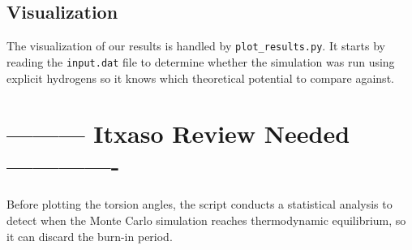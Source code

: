 \subsection{Visualization}\label{visualization}

The visualization of our results is handled by
\texttt{plot\_results.py}. It starts by reading the \texttt{input.dat}
file to determine whether the simulation was run using explicit
hydrogens so it knows which theoretical potential to compare against.

\section{--------- Itxaso Review Needed
-------------}\label{itxaso-review-needed--}

Before plotting the torsion angles, the script conducts a statistical
analysis to detect when the Monte Carlo simulation reaches thermodynamic
equilibrium, so it can discard the burn-in period.

\begin{Shaded}
\begin{Highlighting}[]
\OperatorTok{=} 
\OperatorTok{=} 
\OperatorTok{=} 
    
\OperatorTok{=}\NormalTok{, }\OperatorTok{*} \NormalTok{), }\NormalTok{(}\NormalTok{))}
\OperatorTok{=}
\OperatorTok{=}
\OperatorTok{=}\OperatorTok{{-}}\OperatorTok{/}
        \OperatorTok{\textgreater{}}
\OperatorTok{=}
            
\end{Highlighting}
\end{Shaded}

